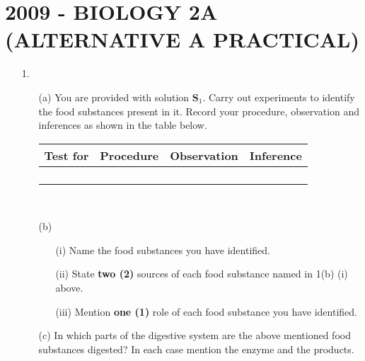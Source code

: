 \section{2009 - BIOLOGY 2A (ALTERNATIVE A PRACTICAL)}

\begin{enumerate}
\item[1.] 
\begin{enumerate}
\item[(a)] You are provided with solution \textbf{S$_1$}. Carry out experiments to identify the food substances present in it. Record your procedure, observation and inferences as shown in the table below.

\begin{center}
\begin{tabular}{|p{3cm}|p{3cm}|p{3cm}|p{3cm}|} \hline
\multicolumn{1}{|c|}{\textbf{Test for}}&\multicolumn{1}{c|}{\textbf{Procedure}}&\multicolumn{1}{c|}{\textbf{Observation}}&\multicolumn{1}{c|}{\textbf{Inference}} \\ \hline
&&& \\
&&& \\
&&& \\
&&& \\ \hline
\end{tabular} \\[10pt]
\end{center}

\item[(b)]
\begin{enumerate}
\item[(i)] Name the food substances you have identified.
\item[(ii)] State \textbf{two (2)} sources of each food substance named in 1(b) (i) above.
\item[(iii)] Mention \textbf{one (1)} role of each food substance you have identified.
\end{enumerate}
\item[(c)] In which parts of the digestive system are the above mentioned food substances digested? In each case mention the enzyme and the products.
\end{enumerate}


\end{enumerate}
